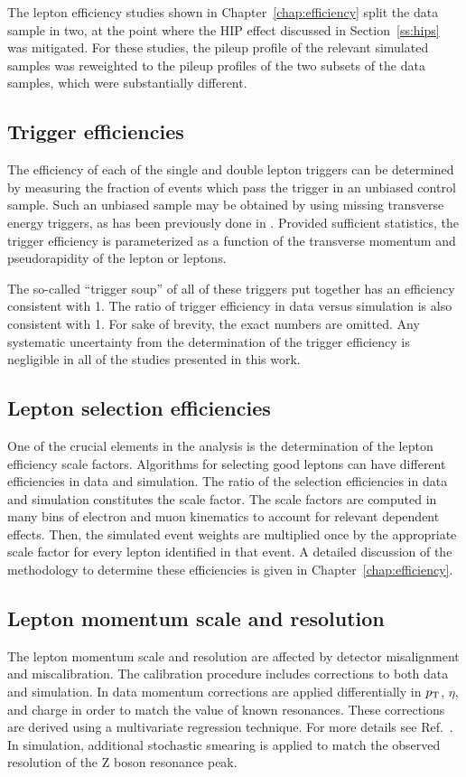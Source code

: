 The lepton efficiency studies shown in Chapter~\ref{chap:efficiency} split the data sample in two,
at the point where the HIP effect discussed in Section~\ref{ss:hips} was mitigated.
For these studies, the pileup profile of the relevant simulated samples was reweighted to
the pileup profiles of the two subsets of the data samples, which were substantially different.

\subsection{Trigger efficiencies}
\label{subsec:trigeff}
The efficiency of each of the single and double lepton triggers can be determined 
by measuring the fraction of events which pass the trigger in an unbiased control sample.
Such an unbiased sample may be obtained by using missing transverse energy triggers, as
has been previously done in \cite{Khachatryan:2015oqa}. 
Provided sufficient statistics, the trigger efficiency is parameterized as a function of the 
transverse momentum and pseudorapidity of the lepton or leptons.

The so-called ``trigger soup'' of all of these triggers put together has an efficiency
consistent with 1.
The ratio of trigger efficiency in data versus simulation is also consistent with 1.
For sake of brevity, the exact numbers are omitted.
Any systematic uncertainty from the determination of the trigger efficiency is negligible in
all of the studies presented in this work.

\subsection{Lepton selection efficiencies}
One of the crucial elements in the analysis is the determination of the lepton efficiency scale factors.
Algorithms for selecting good leptons can have different efficiencies in data and simulation.
The ratio of the selection efficiencies in data and simulation constitutes the scale factor.
The scale factors are computed in many bins of electron and muon kinematics to account for relevant dependent effects.
Then, the simulated event weights are multiplied once by the appropriate scale factor for every
lepton identified in that event. A detailed discussion of the methodology to determine these efficiencies is given in Chapter~\ref{chap:efficiency}.

\subsection{Lepton momentum scale and resolution}
\label{subsec:lepres}
The lepton momentum scale and resolution are affected by detector misalignment 
and miscalibration. The calibration procedure includes corrections to both 
data and simulation.
In data momentum corrections are applied differentially in $p_{\mathrm{T}}$, $\eta$, and charge in order to match the value of known resonances. 
These corrections are derived using a multivariate regression technique.
For more details see Ref.~\cite{Chatrchyan:2013dga}. 
In simulation, additional stochastic smearing is applied to match the observed
resolution of the Z boson resonance peak.

